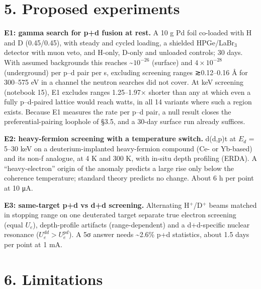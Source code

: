 \documentclass[
]{article}
\begin{document}
\hypertarget{proposed-experiments}{%
\section{5. Proposed experiments}\label{proposed-experiments}}

\textbf{E1: gamma search for p+d fusion at rest.} A 10 g Pd foil
co-loaded with H and D (0.45/0.45), with steady and cycled loading, a
shielded HPGe/LaBr\(_3\) detector with muon veto, and H-only, D-only and
unloaded controls; 30 days. With assumed backgrounds this reaches
\textasciitilde{}\(10^{-26}\) (surface) and \(4\times10^{-28}\)
(underground) per p--d pair per s, excluding screening ranges
≳0.12--0.16 Å for 300--575 eV in a channel the neutron searches did not
cover. At keV screening (notebook 15), E1 excludes ranges 1.25--1.97×
shorter than any at which even a fully p--d-paired lattice would reach
watts, in all 14 variants where such a region exists. Because E1
measures the rate per p--d pair, a null result closes the
preferential-pairing loophole of §3.5, and a 30-day surface run already
suffices.

\textbf{E2: heavy-fermion screening with a temperature switch.} d(d,p)t
at \(E_d\) = 5--30 keV on a deuterium-implanted heavy-fermion compound
(Ce- or Yb-based) and its non-f analogue, at 4 K and 300 K, with in-situ
depth profiling (ERDA). A ``heavy-electron'' origin of the anomaly
predicts a large rise only below the coherence temperature; standard
theory predicts no change. About 6 h per point at 10 μA.

\textbf{E3: same-target p+d vs d+d screening.} Alternating
H\(^+\)/D\(^+\) beams matched in stopping range on one deuterated target
separate true electron screening (equal \(U_e\)), depth-profile
artifacts (range-dependent) and a d+d-specific nuclear resonance
(\(U_e^{dd} > U_e^{pd}\)). A 5σ answer needs \textasciitilde2.6\% p+d
statistics, about 1.5 days per point at 1 mA.

\hypertarget{limitations}{%
\section{6. Limitations}\label{limitations}}
\end{document}

